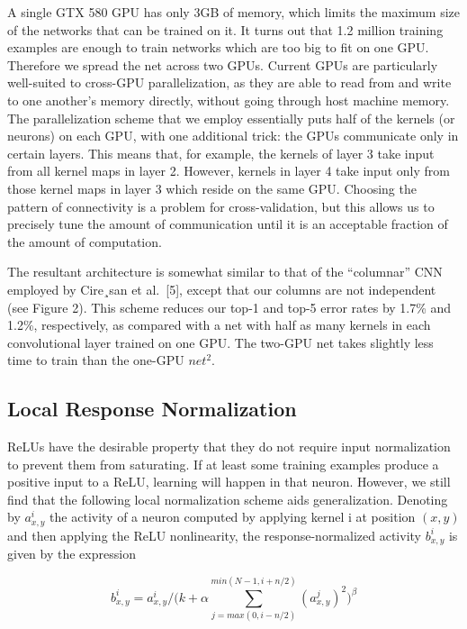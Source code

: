 \documentclass[12pt,a4paper,UTF8,twoside]{book}
\begin{document}
A single GTX 580 GPU has only 3GB of memory, which limits the maximum size of the networks that can be trained on it. It turns out that 1.2 million training examples are enough to train networks which are too big to fit on one GPU. Therefore we spread the net across two GPUs. Current GPUs are particularly well-suited to cross-GPU parallelization, as they are able to read from and write to one another's memory directly, without going through host machine memory. The parallelization scheme that we employ essentially puts half of the kernels (or neurons) on each GPU, with one additional trick: the GPUs communicate only in certain layers. This means that, for example, the kernels of layer 3 take input from all kernel maps in layer 2. However, kernels in layer 4 take input only from those kernel maps in layer 3 which reside on the same GPU. Choosing the pattern of connectivity is a problem for cross-validation, but this allows us to precisely tune the amount of communication until it is an acceptable fraction of the amount of computation.

The resultant architecture is somewhat similar to that of the ``columnar'' CNN employed by Cire¸san et al.~{[}5{]}, except that our columns are not independent (see Figure 2). This scheme reduces our top-1 and top-5 error rates by 1.7\% and 1.2\%, respectively, as compared with a net with half as many kernels in each convolutional layer trained on one GPU. The two-GPU net takes slightly less time to train than the one-GPU \(net^2\).

\hypertarget{local-response-normalization}{%
\subsection{Local Response Normalization}\label{local-response-normalization}}

ReLUs have the desirable property that they do not require input normalization to prevent them from saturating. If at least some training examples produce a positive input to a ReLU, learning will happen in that neuron. However, we still find that the following local normalization scheme aids generalization. Denoting by \(a^i_{x,y}\) the activity of a neuron computed by applying kernel i at position \((x, y)\) and then applying the ReLU nonlinearity, the response-normalized activity \(b^i_{x,y}\) is given by the expression

\[b^i_{x,y} = a^i_{x,y}/\bigg(k+\alpha\sum\limits_{j=max(0,i-n/2)}^{min(N-1,i+n/2)}(a_{x,y}^j)^2\bigg)^\beta\]
\end{document}
